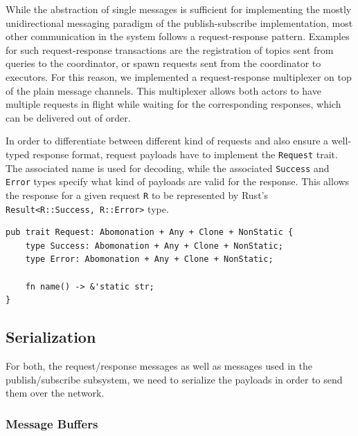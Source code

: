 While the abstraction of single messages is sufficient for implementing the
mostly unidirectional messaging paradigm of the publish-subscribe implementation,
most other communication in the system follows a request-response pattern. Examples
for such request-response transactions are the registration of topics sent from
queries to the coordinator, or spawn requests sent from the coordinator to
executors. For this reason, we implemented a request-response multiplexer on
top of the plain message channels. This multiplexer allows both actors to have
multiple requests in flight while waiting for the corresponding responses,
which can be delivered out of order.

In order to differentiate between different kind of requests and also ensure a
well-typed response format, request payloads have to implement the \lstinline{Request}
trait. The associated name is used for decoding, while the associated \lstinline{Success}
and \lstinline{Error} types specify what kind of payloads are valid for the response.
This allows the response for a given request \lstinline{R} to be represented by
Rust's \lstinline{Result<R::Success, R::Error>} type.

\begin{lstlisting}[caption={[Request trait]In order for a type to be used as a
request message, it needs to implement the \lstinline{Request} trait. The name allows
request handlers to differentiate between different types of requests, while the associated
types forces them to issue well-formed responses.
The trait bounds are explained in section \ref{sec:serialization}.}]
pub trait Request: Abomonation + Any + Clone + NonStatic {
    type Success: Abomonation + Any + Clone + NonStatic;
    type Error: Abomonation + Any + Clone + NonStatic;

    fn name() -> &'static str;
}
\end{lstlisting}

\subsection{Serialization} \label{sec:serialization}

For both, the request/response messages as well as messages used in the publish/subscribe
subsystem, we need to serialize the payloads in order to send them over the network.

\subsubsection{Message Buffers}


